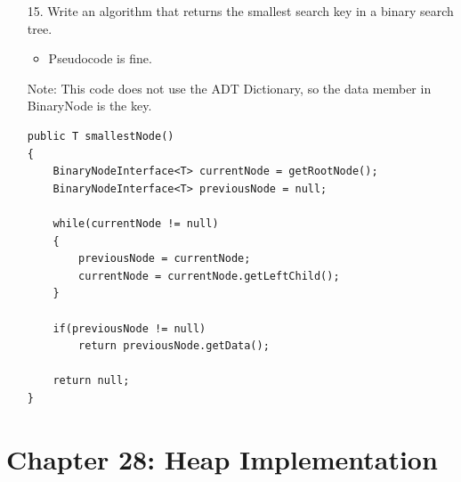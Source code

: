 \documentclass[10pt]{article}
\begin{document}
\begin{enumerate}
	\item[15.] Write an algorithm that returns the smallest search key in a binary search tree.
		\begin{itemize}
			\item Pseudocode is fine.
		\end{itemize}
		
		\vspace{0.5cm}
		Note: This code does not use the ADT Dictionary, so the data member in BinaryNode is the key.
		
		\begin{lstlisting}
public T smallestNode()
{
    BinaryNodeInterface<T> currentNode = getRootNode();
    BinaryNodeInterface<T> previousNode = null;

    while(currentNode != null)
    {
        previousNode = currentNode;
        currentNode = currentNode.getLeftChild();
    }
	
	if(previousNode != null)
	    return previousNode.getData();
	
	return null;
}
		\end{lstlisting}
\end{enumerate}

\section{Chapter 28: Heap Implementation}
\end{document}
